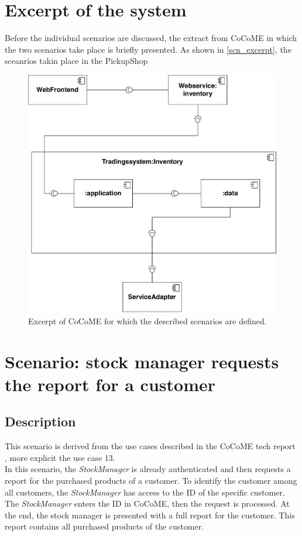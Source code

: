 \section{Excerpt of the system}
Before the individual scenarios are discussed, the extract from CoCoME in which the two scenarios take place is briefly presented. As shown in \autoref{scn_excerpt}, the sceanrios takin place in the PickupShop 
\begin{figure}
\includegraphics[scale=0.8]{logos/ExcerptUC13.pdf}
\caption{Excerpt of CoCoME for which the described scenarios are defined.}
\label{scn_excerpt}
\end{figure}
\section{Scenario: stock manager requests the report for a customer}
\label{descripScn_casestudy_scn1} 
\subsection{Description}
This scenario is derived from the use cases described in the CoCoME tech report \cite{CoCoMETechReport}, more explicit the use case 13. \\
In this scenario, the \textit{StockManager} is already authenticated and then requests a report for the purchased products of a customer. To identify the customer among all customers, the \textit{StockManager} has access to the ID of the specific customer. The \textit{StockManager} enters the ID in CoCoME, then the request is processed. At the end, the stock manager is presented with a full report for the customer. This report contains all purchased products of the customer.
